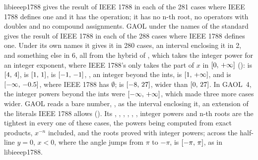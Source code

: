 \medskip
libieeep1788 gives the result of IEEE 1788 in each of the 281 cases where
IEEE 1788 defines one and it has the operation; it has no n-th root, no
operators with doubles and no compound assignments. GAOL under the names of
the standard gives the result of IEEE 1788 in each of the 288 cases where
IEEE 1788 defines one.\newinvfive{} Under its own names it gives it in 280
cases, an interval enclosing it in 2, and something else in 6, all from the
hybrid  of , which takes the integer power for an
integer exponent, where IEEE 1788's  only takes the part of $x$ in
$[0,\,+\infty]$ ():  is
$[4,\,4]$,  is $[1,\,1]$,
 is $[-1,\,-1]$,
, an integer beyond the ints, is
$[1,\,+\infty]$, and  is $[-\infty,\,-0.5]$,
where IEEE 1788 has $\emptyset$;  is $[-8,\,27]$,
wider than $[0,\,27]$. In GAOL~4, the integer powers beyond the ints were
$[-\infty,\,+\infty]$, which made three more cases wider.\newinvfive{} GAOL reads a bare number, ,
as the interval enclosing it, an extension of the literals IEEE 1788 allows
(). Its , , ,
, , , integer powers and n-th roots are
the tightest in every one of these cases, the powers being computed from exact products,
$x^{-n}$ included, and the roots proved with integer powers; across the
half-line $y = 0$, $x < 0$, where the angle jumps from $\pi$ to $-\pi$,
 is $[-\pi,\,\pi]$, as in libieeep1788.

